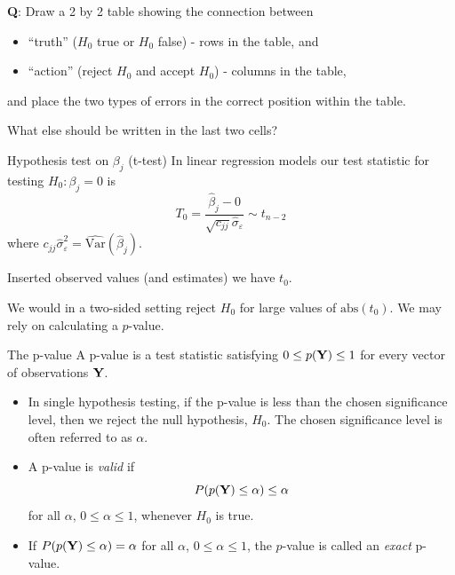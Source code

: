 \documentclass[
  ignorenonframetext,
]{beamer}
\providecommand{\tightlist}{%
  \setlength{\itemsep}{0pt}\setlength{\parskip}{0pt}}
\begin{document}
\begin{frame}
\textbf{Q}: Draw a 2 by 2 table showing the connection between

\begin{itemize}
\tightlist
\item
  ``truth'' (\(H_0\) true or \(H_0\) false) - rows in the table, and
\item
  ``action'' (reject \(H_0\) and accept \(H_0\)) - columns in the table,
\end{itemize}

and place the two types of errors in the correct position within the
table.

What else should be written in the last two cells?
\end{frame}

\begin{frame}
\begin{block}{Hypothesis test on \(\beta_j\) (t-test)}
\label{hypothesis-test-on-beta_j-t-test}
In linear regression models our test statistic for testing
\(H_0: \beta_j=0\) is
\[T_0=\frac{\hat{\beta}_j-0}{\sqrt{c_{jj}}\hat{\sigma}_{\varepsilon}}\sim t_{n-2}\]
where
\(c_{jj}\hat{\sigma}_{\varepsilon}^2=\widehat{\text{Var}}(\hat{\beta}_j)\).

Inserted observed values (and estimates) we have \(t_0\).

We would in a two-sided setting reject \(H_0\) for large values of
\(\text{abs}(t_0)\). We may rely on calculating a \(p\)-value.
\end{block}
\end{frame}

\begin{frame}
\begin{block}{The p-value}
\label{the-p-value}
A p-value is a test statistic satisfying \(0 \leq p({\bf Y}) \leq 1\)
for every vector of observations \({\bf Y}\).

\begin{itemize}
\item
  In single hypothesis testing, if the p-value is less than the chosen
  significance level, then we reject the null hypothesis, \(H_0\). The
  chosen significance level is often referred to as \(\alpha\).
\item
  A p-value is \emph{valid} if
  \[ P(p({\bf Y}) \leq \alpha) \leq \alpha\] for all \(\alpha\),
  \(0 \leq \alpha \leq 1\), whenever \(H_0\) is true.
\item
  If \(P(p({\bf Y}) \leq \alpha) = \alpha\) for all \(\alpha\),
  \(0 \leq \alpha \leq 1\), the \(p\)-value is called an \emph{exact}
  p-value.
\end{itemize}
\end{block}
\end{frame}
\end{document}
